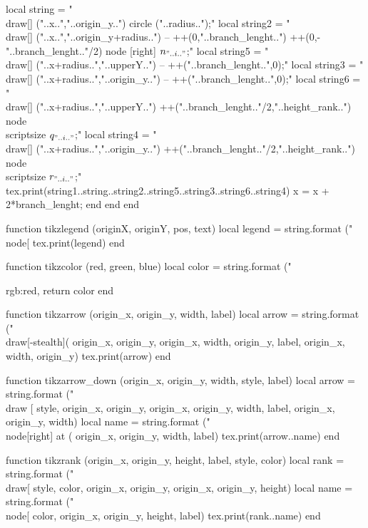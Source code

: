 \begin{luacode*}
          local string = "\\draw[] ("..x..","..origin_y..") circle ("..radius..");"
          local string2 = "\\draw[] ("..x..","..origin_y+radius..") -- ++(0,"..branch_lenght..") ++(0,-"..branch_lenght.."/2) node [right] {$n_{"..i.."}$};"
          local string5 = "\\draw[] ("..x+radius..","..upperY..") -- ++("..branch_lenght..",0);"
          local string3 = "\\draw[] ("..x+radius..","..origin_y..") -- ++("..branch_lenght..",0);"
          local string6 = "\\draw[] ("..x+radius..","..upperY..") ++("..branch_lenght.."/2,"..height_rank..") node {\\scriptsize $q_{"..i.."}$};"
          local string4 = "\\draw[] ("..x+radius..","..origin_y..") ++("..branch_lenght.."/2,"..height_rank..") node {\\scriptsize $r_{"..i.."}$};"
          tex.print(string1..string..string2..string5..string3..string6..string4)
          x = x + 2*branch_lenght;
        end
      end
    end

  function tikzlegend (originX, originY, pos, text)
  local legend = string.format ("\\node[%
  tex.print(legend)
  end

  function tikzcolor (red, green, blue)
  local color = string.format ("{rgb:red,%
  return color
  end

  function tikzarrow (origin_x, origin_y, width, label)
  local arrow = string.format ("\\draw[-stealth](%
  origin_x, origin_y, origin_x, width, origin_y, label, origin_x, width, origin_y)
  tex.print(arrow)
  end

  function tikzarrow_down (origin_x, origin_y, width, style, label)
  local arrow = string.format ("\\draw [%
  style, origin_x, origin_y, origin_x, origin_y, width, label, origin_x, origin_y, width)
  local name = string.format ("\\node[right] at (%
  origin_x, origin_y, width, label)
  tex.print(arrow..name)
  end

  function tikzrank (origin_x, origin_y, height, label, style, color)
  local rank = string.format ("\\draw[%
  style, color, origin_x, origin_y, origin_x, origin_y, height)
  local name = string.format ("\\node[%
  color, origin_x, origin_y, height, label)
  tex.print(rank..name)
  end

}
\end{luacode*}
